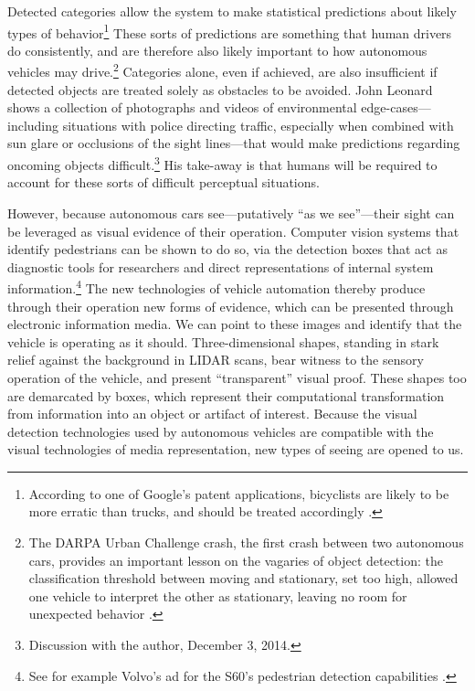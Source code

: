 Detected categories allow the system to make
statistical predictions about likely types of behavior\footnote{According to
one of Google's patent applications, bicyclists are likely to be more
erratic than trucks, and should be treated
accordingly \cite{predictPatent}.} These sorts of predictions are
something that human drivers do consistently, and are therefore also
likely important to how autonomous vehicles may drive.\footnote{The
  DARPA Urban Challenge crash, the first crash between two autonomous
  cars, provides an important lesson on the vagaries of object
  detection: the classification threshold between moving and
  stationary, set too high, allowed one vehicle to interpret the other
  as stationary, leaving no room for unexpected behavior \cite{collisionPaper}.}
Categories alone, even if achieved, are also insufficient if detected
objects are treated solely as obstacles to be avoided. John Leonard
shows a collection of photographs and videos of environmental
edge-cases---including situations with police  
directing traffic, especially when combined with sun glare or
occlusions of the sight lines---that
would make predictions regarding oncoming 
objects difficult.\footnote{Discussion with the author, December 3,
  2014.} His take-away is that humans will be
required to account for these sorts of difficult perceptual
situations. 



However, because autonomous cars see---putatively ``as we see''---their sight can
be leveraged as visual evidence of their operation. Computer vision
systems that identify 
pedestrians can be shown to do so, via the detection boxes that act as
diagnostic tools for researchers and direct representations of
internal system information.\footnote{See for example Volvo's ad for
  the S60's pedestrian detection capabilities \cite{volvovideo}.} The new technologies of vehicle
automation thereby produce through 
their operation new forms of evidence, which can be presented through
electronic information media. We can point to these images and identify
that the vehicle is operating as it should. Three-dimensional shapes,
standing in stark relief against 
the background in LIDAR scans, bear witness to the sensory operation
of the vehicle, and present ``transparent'' visual proof.
These shapes too are demarcated by boxes, which represent their
computational transformation from information into an object or
artifact of interest. Because the visual detection technologies used
by autonomous vehicles are compatible with the visual technologies of
media representation, new types of seeing are opened to us.

